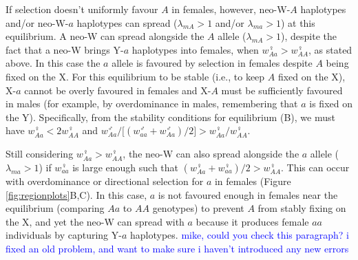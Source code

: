 \documentclass[12pt]{article}
\begin{document}
If selection doesn't uniformly favour $A$ in females, however, neo-W-$A$ haplotypes and/or neo-W-$a$ haplotypes can spread ($\lambda_{mA}>1$ and/or $\lambda_{ma}>1$) at this equilibrium.
A neo-W can spread alongside the $A$ allele ($\lambda_{mA}>1$), despite the fact that a neo-W brings Y-$a$ haplotypes into females, when $w_{Aa}^\female>w_{AA}^\female$, as stated above.
In this case the $a$ allele is favoured by selection in females despite $A$ being fixed on the X.
For this equilibrium to be stable (i.e.,  to keep $A$ fixed on the X), X-$a$ cannot be overly favoured in females and X-$A$ must be sufficiently favoured in males (for example, by overdominance in males, remembering that $a$ is fixed on the Y). 
Specifically, from the stability conditions for equilibrium (B), we must have $w_{Aa}^\female < 2 w_{AA}^\female$ and $w_{Aa}^\male/\big[(w_{aa}^\male+w_{Aa}^\male)/2\big]>w_{Aa}^\female/w_{AA}^\female$.

Still considering $w_{Aa}^\female>w_{AA}^\female$, the neo-W can also spread alongside the $a$ allele ($\lambda_{ma}>1$) if $w_{aa}^\female$ is large enough such that $(w_{Aa}^\female+w_{aa}^\female)/2>w_{AA}^\female$.
This can occur with overdominance or directional selection for $a$ in females (Figure \ref{fig:regionplots}B,C).
In this case, $a$ is not favoured enough in females near the equilibrium (comparing $Aa$ to $AA$ genotypes) to prevent $A$ from stably fixing on the X, and yet the neo-W can spread with $a$ because it produces female $aa$ individuals by capturing Y-$a$ haplotypes.
\textcolor{blue}{mike, could you check this paragraph? i fixed an old problem, and want to make sure i haven't introduced any new errors}


\end{document}
